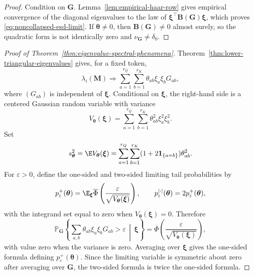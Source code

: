 \documentclass{article}
\newcommand{\Prob}{\mathbb{P}}
\newcommand{\weak}{\Rightarrow}
\newcommand{\bB}{\mathbf{B}}
\newcommand{\bM}{\mathbf{M}}
\newcommand{\bG}{\mathbf{G}}
\newcommand{\barPhi}{\overline{\Phi}}
\theoremstyle{remark}
\begin{document}
\begin{proof}
Condition on $\bG$.  Lemma~\ref{lem:empirical-haar-row} gives empirical
convergence of the diagonal eigenvalues to the law of
$\boldsymbol{\xi}^\top\bB(\bG)\boldsymbol{\xi}$, which proves
\eqref{eq:noncollapsed-esd-limit}.  If $\boldsymbol{\theta}\neq0$, then
$\bB(\bG)\neq0$ almost surely, so the quadratic form is not identically zero and
$\nu_{\bG}\neq\delta_0$.
\end{proof}

\begin{proof}[Proof of Theorem~\ref{thm:eigenvalue-spectral-phenomena}]
Theorem~\ref{thm:lower-triangular-eigenvalues} gives, for a fixed token,
\[
    \lambda_i(\bM)
    \weak
    \sum_{a=1}^{r_Q}\sum_{b=1}^{r_K}
    \theta_{ab}\xi_a\xi_bG_{ab},
\]
where $(G_{ab})$ is independent of $\boldsymbol{\xi}$.  Conditional on
$\boldsymbol{\xi}$, the right-hand side is a centered Gaussian random variable
with variance
\[
    V_{\boldsymbol{\theta}}(\boldsymbol{\xi})
    =
    \sum_{a=1}^{r_Q}\sum_{b=1}^{r_K}
    \theta_{ab}^2\xi_a^2\xi_b^2.
\]
Set
\[
    s_{\boldsymbol{\theta}}^2
    =
    \E V_{\boldsymbol{\theta}}(\boldsymbol{\xi})
    =
    \sum_{a=1}^{r_Q}\sum_{b=1}^{r_K}
    (1+2\mathbf 1_{\{a=b\}})\theta_{ab}^2.
\]
For $\varepsilon>0$, define the one-sided and two-sided limiting tail
probabilities by
\begin{equation}
    p_\varepsilon^+(\boldsymbol{\theta})
    =
    \E_{\boldsymbol{\xi}}
    \barPhi\left(
        \frac{\varepsilon}
        {\sqrt{V_{\boldsymbol{\theta}}(\boldsymbol{\xi})}}
    \right),
    \qquad
    p_\varepsilon^{|\cdot|}(\boldsymbol{\theta})
    =
    2p_\varepsilon^+(\boldsymbol{\theta}),
    \label{eq:eigenvalue-tail-definitions}
\end{equation}
with the integrand set equal to zero when
$V_{\boldsymbol{\theta}}(\boldsymbol{\xi})=0$.
Therefore
\[
    \Prob_{\bG}
    \left\{
    \sum_{a,b}\theta_{ab}\xi_a\xi_bG_{ab}>\varepsilon
    \,\middle|\,\boldsymbol{\xi}
    \right\}
    =
    \barPhi\left(
        \frac{\varepsilon}{\sqrt{V_{\boldsymbol{\theta}}(\boldsymbol{\xi})}}
    \right),
\]
with value zero when the variance is zero.  Averaging over
$\boldsymbol{\xi}$ gives the one-sided formula defining
$p_\varepsilon^+(\boldsymbol{\theta})$.  Since the limiting variable is
symmetric about zero after averaging over $\bG$, the two-sided formula is twice
the one-sided formula.


\end{proof}
\end{document}

